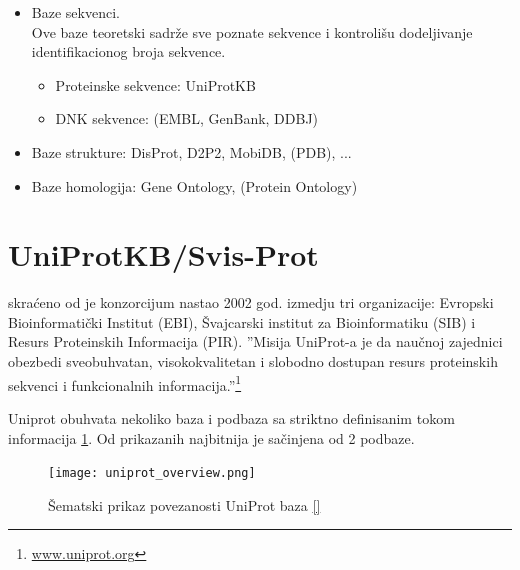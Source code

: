 \begin{itemize}
  \item Baze sekvenci.\\ 
        Ove baze teoretski sadrže sve poznate sekvence i kontrolišu dodeljivanje 
        identifikacionog broja sekvence.
    \begin{itemize}
      \item Proteinske sekvence: UniProtKB
      \item DNK sekvence: (EMBL, GenBank, DDBJ)
    \end{itemize}
  \item Baze strukture: DisProt, D2P2, MobiDB, (PDB), ...
  \item Baze homologija: Gene Ontology, (Protein Ontology)
\end{itemize}


\section{UniProtKB/Svis-Prot}
\label{svis-prot}

 skraćeno od  je konzorcijum
nastao 2002 god. izmedju tri organizacije: Evropski Bioinformatički
Institut (EBI), Švajcarski institut za Bioinformatiku (SIB) i Resurs
Proteinskih Informacija (PIR).  ''Misija UniProt-a je da naučnoj zajednici
obezbedi sveobuhvatan, visokokvalitetan i slobodno dostupan resurs proteinskih
sekvenci i funkcionalnih informacija.''\footnote{\url{www.uniprot.org}} 


Uniprot obuhvata nekoliko baza i podbaza sa striktno definisanim tokom
informacija \ref{fig:uniprot_overview}. Od prikazanih najbitnija je
  sačinjena od 2 podbaze.

\begin{figure}[h!]
  \centering
  \texttt{[image: uniprot\_overview.png]}
  \caption{Šematski prikaz povezanosti UniProt baza \ref{}}
  \label{fig:uniprot_overview}
\end{figure}

